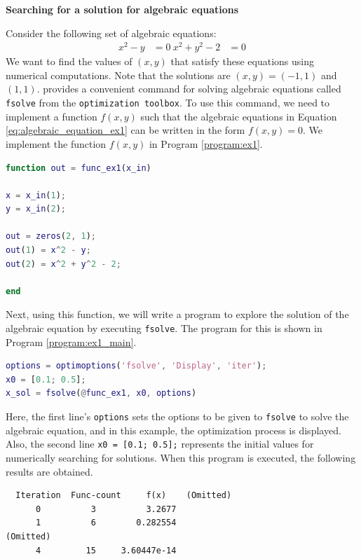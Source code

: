 \documentclass[graybox, envcountchap]{svmult}
\begin{document}
\begin{example}{\textbf{Searching for a solution for algebraic
equations}}\label{ex:algenraic_equation_ex1}

Consider the following set of algebraic equations:
\begin{subequations}\label{eq:algebraic_equation_ex1}
\begin{align}
x^2 - y &= 0\
x^2 + y^2 - 2 &= 0
\end{align}
\end{subequations}
We want to find the values of $(x, y)$ that satisfy these equations using
numerical computations. Note that the solutions are $(x, y) = (-1, 1)$ and $(1,
1)$. \matlab provides a convenient command for solving algebraic equations
called \verb|fsolve| from the \verb|optimization toolbox|. To use this command,
we need to implement a function $f(x, y)$ such that the algebraic equations in
Equation \ref{eq:algebraic_equation_ex1} can be written in the form $f(x, y) =
0$.  We implement the function $f(x, y)$ in Program \ref{program:ex1}.

\begin{lstlisting}[language=Matlab, caption=func\_ex1.m, label={program:ex1}]
function out = func_ex1(x_in)

x = x_in(1);
y = x_in(2);

out = zeros(2, 1);
out(1) = x^2 - y;
out(2) = x^2 + y^2 - 2;

end
\end{lstlisting}

Next, using this function, we will write a program to explore the solution of
the algebraic equation by executing \verb|fsolve|. The program for this is
shown in Program \ref{program:ex1_main}.

\begin{lstlisting}[language=Matlab, caption=main\_ex1.m, label={program:ex1_main}]
options = optimoptions('fsolve', 'Display', 'iter');
x0 = [0.1; 0.5];
x_sol = fsolve(@func_ex1, x0, options)
\end{lstlisting}

Here, the first line's \verb|options| sets the options to be given to
\verb|fsolve| to solve the algebraic equation, and in this example, the
optimization process is displayed. Also, the second line \verb|x0 = [0.1; 0.5];|
represents the initial values for numerically searching for solutions.  When
this program is executed, the following results are obtained.

\smallskip
\begin{execution}
\begin{verbatim}
  Iteration  Func-count     f(x)    (Omitted) 
      0          3          3.2677
      1          6        0.282554
(Omitted)
      4         15     3.60447e-14


\end{verbatim}
\end{execution}
\end{example}
\end{document}
